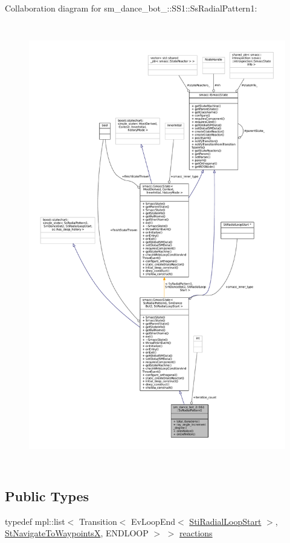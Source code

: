 Collaboration diagram for sm\+\_\+dance\+\_\+bot\+\_\+:\+:S\+S1\+:\+:Ss\+Radial\+Pattern1\+:
\nopagebreak
\begin{figure}[H]
\begin{center}
\leavevmode
\includegraphics[height=550pt]{structsm__dance__bot__2_1_1SS1_1_1SsRadialPattern1__coll__graph}
\end{center}
\end{figure}
\subsection*{Public Types}
\begin{DoxyCompactItemize}
\item 
typedef mpl\+::list$<$ Transition$<$ Ev\+Loop\+End$<$ \hyperlink{structsm__dance__bot__2_1_1radial__motion__states_1_1StiRadialLoopStart}{Sti\+Radial\+Loop\+Start} $>$, \hyperlink{structsm__dance__bot__2_1_1StNavigateToWaypointsX}{St\+Navigate\+To\+WaypointsX}, E\+N\+D\+L\+O\+OP $>$ $>$ \hyperlink{structsm__dance__bot__2_1_1SS1_1_1SsRadialPattern1_ac3147241844d2bd0342377c218ba8362}{reactions}
\end{DoxyCompactItemize}
